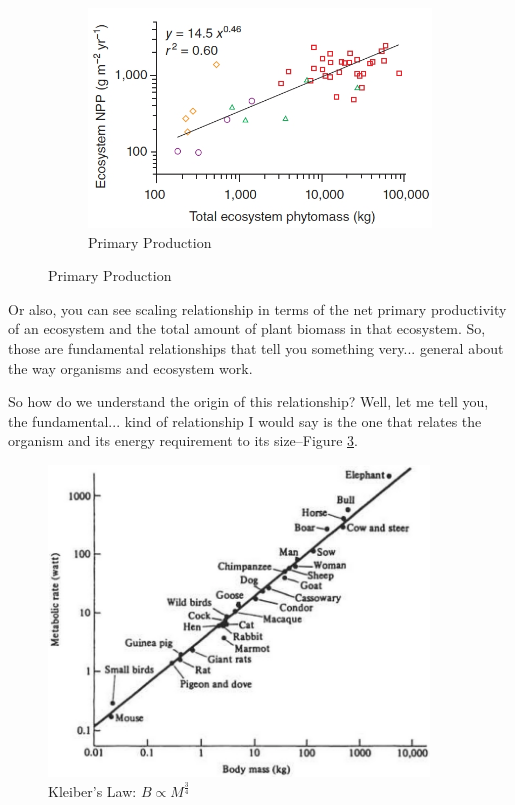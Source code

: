 \documentclass[]{article}
\begin{document}
\begin{figure}[H]
\begin{subfigure}[b]{0.45\textwidth}
		\caption{Primary Production\cite{enquist2012land}}\label{fig:npp}
		\includegraphics[width=\textwidth]{Scaling3}
	\end{subfigure}
\end{figure}

Or also, you can see scaling
relationship in terms of
the net primary productivity
of an ecosystem
and the total amount of
plant biomass in that ecosystem.
So, those are fundamental relationships
that tell you something very... general
about the way organisms
and ecosystem work.

So how do we understand
the origin of this relationship?
Well, let me tell you, the fundamental...
kind of relationship I would say is
the one that relates the organism
and its energy requirement to its size--Figure \ref{fig:Kleiber}.

\begin{figure}[H]
	\caption[Kleiber's Law]{Kleiber's Law: $B \propto M^\frac{3}{4}$\cite{schmidt1984scaling}}\label{fig:Kleiber}
	\includegraphics[width=0.9\textwidth]{Kleiber}
\end{figure}
\end{document}
